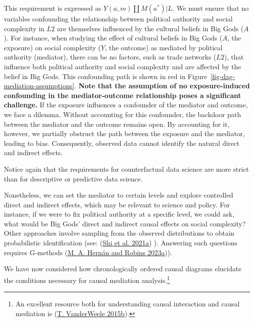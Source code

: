 \documentclass[
  singlecolumn]{report}
\begin{document}
This requirement is expressed as \(Y(a,m) \coprod M(a^*) | L\). We must
ensure that no variables confounding the relationship between political
authority and social complexity in \(L2\) are themselves influenced by
the cultural beliefs in Big Gods (\(A\)). For instance, when studying
the effect of cultural beliefs in Big Gods (\(A\), the exposure) on
social complexity (\(Y\), the outcome) as mediated by political
authority (mediator), there can be no factors, such as trade networks
(\(L2\)), that influence both political authority and social complexity
and are affected by the belief in Big Gods. This confounding path is
shown in red in Figure~\ref{fig-dag-mediation-assumptions}. \textbf{Note
that the assumption of no exposure-induced confounding in the
mediator-outcome relationship poses a significant challenge.} If the
exposure influences a confounder of the mediator and outcome, we face a
dilemma. Without accounting for this confounder, the backdoor path
between the mediator and the outcome remains open. By accounting for it,
however, we partially obstruct the path between the exposure and the
mediator, leading to bias. Consequently, observed data cannot identify
the natural direct and indirect effects.

Notice again that the requirements for counterfactual data science are
more strict than for descriptive or predictive data science.

Nonetheless, we can set the mediator to certain levels and explore
controlled direct and indirect effects, which may be relevant to science
and policy. For instance, if we were to fix political authority at a
specific level, we could ask, what would be Big Gods' direct and
indirect causal effects on social complexity? Other approaches involve
sampling from the observed distributions to obtain probabilistic
identification (see: (\protect\hyperlink{ref-shi2021}{Shi et al. 2021a})
). Answering such questions requires G-methods
(\protect\hyperlink{ref-hernuxe1n2023a}{M. A. Hernán and Robins
2023a})).

We have now considered how chronologically ordered causal diagrams
elucidate the conditions necessary for causal mediation
analysis.\footnote{An excellent resource both for understanding causal
  interaction and causal mediation is
  (\protect\hyperlink{ref-vanderweele2015}{T. VanderWeele 2015b}).}
\end{document}
